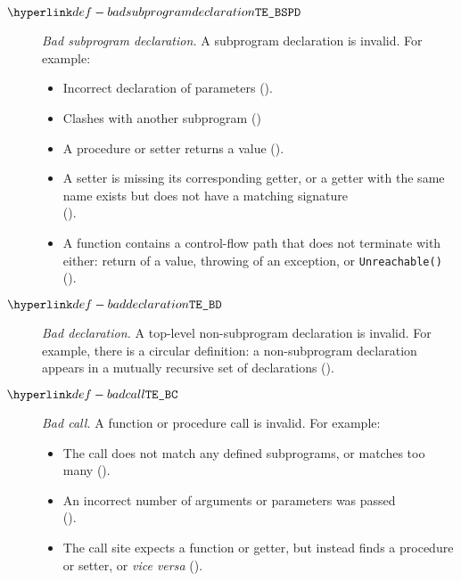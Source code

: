 \begin{description}
\hypertarget{def-badsubprogramdeclaration}{}
\item[$\BadSubprogramDeclaration$]
  \textit{Bad subprogram declaration.}
  A subprogram declaration is invalid.
  For example:
  \begin{itemize}
    \item Incorrect declaration of parameters ().
    \item Clashes with another subprogram ()
    \item A procedure or setter returns a value ().
    \item A setter is missing its corresponding getter, or a getter with the same name exists but does not have a matching signature \\
          ().
    \item A function contains a control-flow path that does not terminate with either:
          return of a value, throwing of an exception, or \texttt{Unreachable()} \\
      ().
  \end{itemize}

\hypertarget{def-baddeclaration}{}
\item[$\BadDeclaration$]
  \textit{Bad declaration.}
  A top-level non-subprogram declaration is invalid.
  For example, there is a circular definition: a non-subprogram declaration appears in a mutually recursive set of declarations ().

\hypertarget{def-badcall}{}
\item[$\BadCall$]
  \textit{Bad call.}
  A function or procedure call is invalid.
  For example:
  \begin{itemize}
    \item The call does not match any defined subprograms, or matches too many ().
    \item An incorrect number of arguments or parameters was passed \\
      ().
    \item The call site expects a function or getter, but instead finds a procedure or setter, or \textit{vice versa} ().
  \end{itemize}


\end{description}
